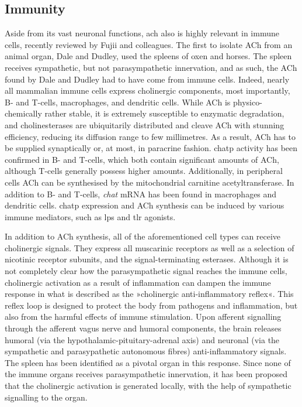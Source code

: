 \subsection{Immunity} \label{sec:intro:immunity}
Aside from its vast neuronal functions, \ac{ach} also is highly relevant in immune cells, recently reviewed by Fujii and colleagues.\cite{Fujii2017} The first to isolate ACh from an animal organ, Dale and Dudley,\cite{Dale1929} used the spleens of oxen and horses. The spleen receives sympathetic, but not parasympathetic innervation, and as such, the ACh found by Dale and Dudley had to have come from immune cells. Indeed, nearly all mammalian immune cells express cholinergic components, most importantly, B- and T-cells, macrophages, and dendritic cells. While ACh is physico-chemically rather stable, it is extremely susceptible to enzymatic degradation, and cholinesterases are ubiquitarily distributed and cleave ACh with stunning efficiency, reducing its diffusion range to few millimetres. As a result, ACh has to be supplied synaptically or, at most, in paracrine fashion. \Ac{chatp} activity has been confirmed in B- and T-cells, which both contain significant amounts of ACh, although T-cells generally possess higher amounts. Additionally, in peripheral cells ACh can be synthesised by the mitochondrial carnitine acetyltransferase. In addition to B- and T-cells, \emph{\acs{chat}} mRNA has been found in macrophages and dendritic cells. \ac{chatp} expression and ACh synthesis can be induced by various immune mediators, such as \ac{lps} and \ac{tlr} agonists.

In addition to ACh synthesis, all of the aforementioned cell types can receive cholinergic signals. They express all muscarinic receptors as well as a selection of nicotinic receptor subunits, and the signal-terminating esterases. Although it is not completely clear how the parasympathetic signal reaches the immune cells, cholinergic activation as a result of inflammation can dampen the immune response in what is described as the »cholinergic anti-inflammatory reflex«.\cite{Pavlov2017} This reflex loop is designed to protect the body from pathogens and inflammation, but also from the harmful effects of immune stimulation. Upon afferent signalling through the afferent vagus nerve and humoral components, the brain releases humoral (via the hypothalamic-pituitary-adrenal axis) and neuronal (via the sympathetic and parasypathetic autonomous fibres) anti-inflammatory signals. The spleen has been identified as a pivotal organ in this response. Since none of the immune organs receives parasympathetic innervation, it has been proposed that the cholinergic activation is generated locally, with the help of sympathetic signalling to the organ.\cite{Dantzer2018}

